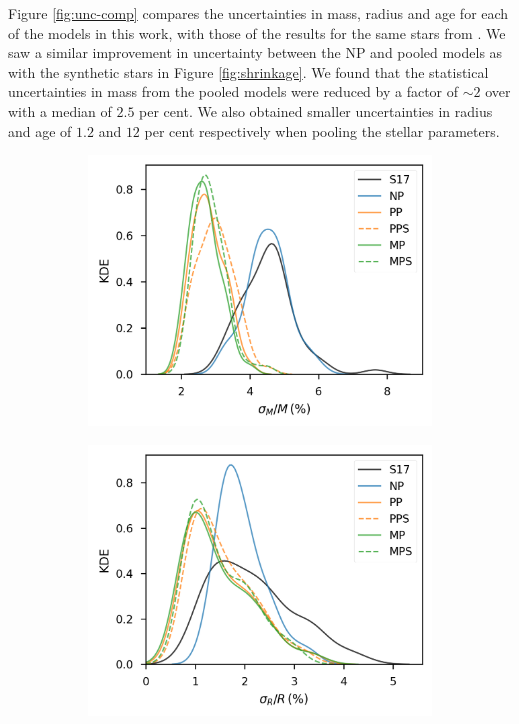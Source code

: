 \documentclass[a4paper,fleqn,usenatbib]{mnras}
\begin{document}
Figure \ref{fig:unc-comp} compares the uncertainties in mass, radius and age for each of the models in this work, with those of the results for the same stars from . We saw a similar improvement in uncertainty between the NP and pooled models as with the synthetic stars in Figure \ref{fig:shrinkage}. We found that the statistical uncertainties in mass from the pooled models were reduced by a factor of $\sim 2$ over  with a median of $2.5$ per cent. We also obtained smaller uncertainties in radius and age of $1.2$ and $12$ per cent respectively when pooling the stellar parameters.

\begin{figure}
    \centering
    \begin{subfigure}[b]{.33\linewidth}
        \centering
        \includegraphics[width=\linewidth]{figures/sigma_mass.png}
    \end{subfigure}%
    \begin{subfigure}[b]{.33\linewidth}
        \centering
        \includegraphics[width=\linewidth]{figures/sigma_rad.png}

\end{subfigure}
\end{figure}
\end{document}
